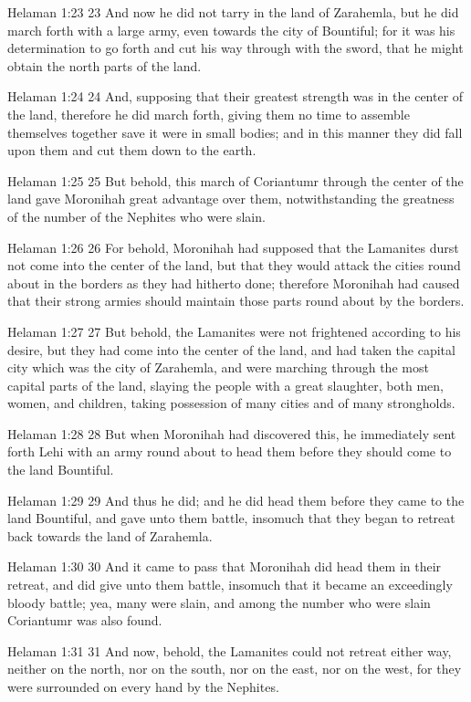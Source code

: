 Helaman 1:23
 23 And now he did not tarry in the land of Zarahemla, but he did
march forth with a large army, even towards the city of
Bountiful; for it was his determination to go forth and cut his
way through with the sword, that he might obtain the north parts
of the land.

Helaman 1:24
 24 And, supposing that their greatest strength was in the center
of the land, therefore he did march forth, giving them no time to
assemble themselves together save it were in small bodies; and in
this manner they did fall upon them and cut them down to the
earth.

Helaman 1:25
 25 But behold, this march of Coriantumr through the center of
the land gave Moronihah great advantage over them,
notwithstanding the greatness of the number of the Nephites who
were slain.

Helaman 1:26
 26 For behold, Moronihah had supposed that the Lamanites durst
not come into the center of the land, but that they would attack
the cities round about in the borders as they had hitherto done;
therefore Moronihah had caused that their strong armies should
maintain those parts round about by the borders.

Helaman 1:27
 27 But behold, the Lamanites were not frightened according to
his desire, but they had come into the center of the land, and
had taken the capital city which was the city of Zarahemla, and
were marching through the most capital parts of the land, slaying
the people with a great slaughter, both men, women, and children,
taking possession of many cities and of many strongholds.

Helaman 1:28
 28 But when Moronihah had discovered this, he immediately sent
forth Lehi with an army round about to head them before they
should come to the land Bountiful.

Helaman 1:29
 29 And thus he did; and he did head them before they came to the
land Bountiful, and gave unto them battle, insomuch that they
began to retreat back towards the land of Zarahemla.

Helaman 1:30
 30 And it came to pass that Moronihah did head them in their
retreat, and did give unto them battle, insomuch that it became
an exceedingly bloody battle; yea, many were slain, and among the
number who were slain Coriantumr was also found.

Helaman 1:31
 31 And now, behold, the Lamanites could not retreat either way,
neither on the north, nor on the south, nor on the east, nor on
the west, for they were surrounded on every hand by the Nephites.

